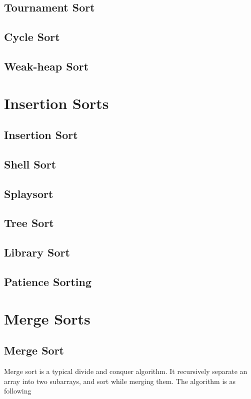 			\subsection{Tournament Sort}

			\subsection{Cycle Sort}

			\subsection{Weak-heap Sort}

		\section{Insertion Sorts}
			\subsection{Insertion Sort}

			\subsection{Shell Sort}

			\subsection{Splaysort}

			\subsection{Tree Sort}

			\subsection{Library Sort}

			\subsection{Patience Sorting}

		\section{Merge Sorts}
			\subsection{Merge Sort}
				Merge sort is a typical divide and conquer algorithm. It recursively separate an array into two subarrays, and sort while merging them. The algorithm is as following

